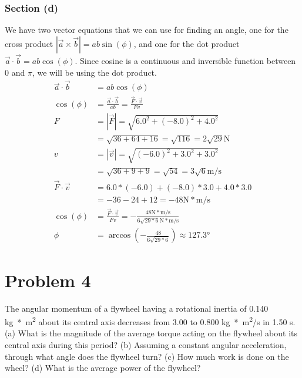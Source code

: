 \documentclass[12pt]{article}
\begin{document}
\subsubsection{Section (d)}
We have two vector equations that we can use for finding an angle, one for the cross product \(\left|\vec{a}\times\vec{b}\right| = ab\sin(\phi)\), and one for the dot product \(\vec{a}\cdot\vec{b} = ab\cos(\phi)\). Since cosine is a continuous and inversible function between 0 and $\pi$, we will be using the dot product.
\begin{align}
    \vec{a}\cdot\vec{b} &=  ab\cos(\phi)\\
    \cos(\phi)  &=  \frac{\vec{a}\cdot\vec{b}}{ab}
        =   \frac{\vec{F}\cdot\vec{v}}{Fv}\\
    F   &=  \left|\vec{F}\right|
        =   \sqrt{6.0^2 + (-8.0)^2 + 4.0^2}\\
        &=  \sqrt{36 + 64 + 16}
        =   \sqrt{116}
        =   2\sqrt{29}\unit{\newton}\\
    v   &=  \left|\vec{v}\right|
        =   \sqrt{(-6.0)^2 + 3.0^2 + 3.0^2}\\
        &=  \sqrt{36 + 9 + 9}
        =   \sqrt{54}
        =   3\sqrt{6}\unit{\meter/\second}\\
    \vec{F}\cdot\vec{v} &=  6.0*(-6.0) + (-8.0)*3.0 + 4.0*3.0\\
        &=  - 36 - 24 + 12
        =   -48\unit{\newton*\meter/\second}\\
    \cos(\phi)  &=  \frac{\vec{F}\cdot\vec{v}}{Fv}
        =   -\frac{48\unit{\newton*\meter/\second}}{6\sqrt{29*6}\unit{\newton*\meter/\second}}\\
    \phi    &=  \arccos\left(-\frac{48}{6\sqrt{29*6}}\right)
        \approx \boxed{127.3\unit{\degree}}
\end{align}

\pagebreak
\section{Problem 4}
The angular momentum of a flywheel having a rotational inertia of 0.140 \unit{\kilo\gram*\meter^2} about its central axis decreases from 3.00 to 0.800 \unit{\kilo\gram*\meter^2/\second} in 1.50 \unit{\second}. (a) What is the magnitude of the average torque acting on the flywheel about its central axis during this period? (b) Assuming a constant angular acceleration, through what angle does the flywheel turn? (c) How much work is done on the wheel? (d) What is the average power of the flywheel?
\end{document}
